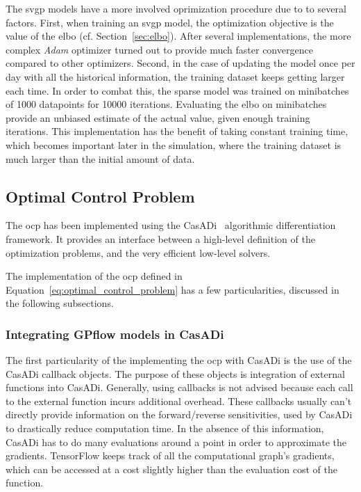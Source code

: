 The \acrshort{svgp} models have a more involved oprimization procedure due to to
several factors. First, when training an \acrshort{svgp} model, the optimization
objective is the value of the \acrshort{elbo} (cf. Section~\ref{sec:elbo}).
After several implementations, the more complex \textit{Adam} optimizer turned
out to provide much faster convergence compared to other optimizers. Second, in
the case of updating the model once per day with all the historical information,
the training dataset keeps getting larger each time. In order to combat this,
the sparse model was trained on minibatches of 1000 datapoints for 10000
iterations. Evaluating the \acrshort{elbo} on minibatches provide an unbiased
estimate of the actual value, given enough training iterations. This
implementation has the benefit of taking constant training time, which becomes
important later in the simulation, where the training dataset is much larger
than the initial amount of data.  

\subsection{Optimal Control Problem}

The \acrlong{ocp} has been implemented using the
CasADi~\cite{anderssonCasADiSoftwareFramework2019} algorithmic differentiation
framework. It provides an interface between a high-level definition of the
optimization problems, and the very efficient low-level solvers. 

The implementation of the \acrshort{ocp} defined in
Equation~\ref{eq:optimal_control_problem} has a few particularities, discussed
in the following subsections.

\subsubsection{Integrating GPflow models in CasADi}

The first particularity of the implementing the \acrshort{ocp} with CasADi is
the use of the CasADi callback objects. The purpose of these objects is
integration of external functions into CasADi. Generally, using callbacks is not
advised because each call to the external function incurs additional overhead.
These callbacks usually can't directly provide information on the
forward/reverse sensitivities, used by CasADi to drastically reduce computation
time. In the absence of this information, CasADi has to do many evaluations
around a point in order to approximate the gradients. TensorFlow keeps track of
all the computational graph's gradients, which can be accessed at a cost
slightly higher than the evaluation cost of the function.

